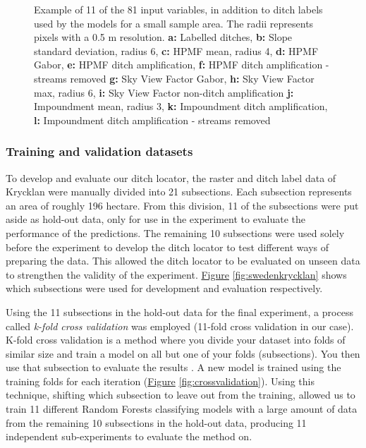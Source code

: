 \documentclass[]{interact}
\theoremstyle{plain}%
\theoremstyle{definition}
\theoremstyle{remark}
\begin{document}
\begin{figure} [!htb]
    \caption{Example of 11 of the 81 input variables, in addition to ditch labels used by the models for a small sample area. The radii represents pixels with a 0.5 m resolution. \newline \textbf{a:} Labelled ditches, \textbf{b:} Slope standard deviation, radius 6, \textbf{c:} HPMF mean, radius 4, \textbf{d:} HPMF Gabor, \textbf{e:} HPMF ditch amplification, \textbf{f:} HPMF ditch amplification - streams removed \textbf{g:} Sky View Factor Gabor, \textbf{h:} Sky View Factor max, radius 6, \textbf{i:} Sky View Factor non-ditch amplification  \textbf{j:} Impoundment mean, radius 3, \textbf{k:} Impoundment ditch amplification, \textbf{l:} Impoundment ditch amplification - streams removed}
    \label{fig:features}
\end{figure}
\clearpage

\subsubsection{Training and validation datasets}
\label{trainingvalidationdatasets}
To develop and evaluate our ditch locator, the raster and ditch label data of Krycklan were manually divided into 21 subsections. Each subsection represents an area of roughly 196 hectare. From this division, 11 of the subsections were put aside as hold-out data, only for use in the experiment to evaluate the performance of the predictions. The remaining 10 subsections were used solely before the experiment to develop the ditch locator to test different ways of preparing the data. This allowed the ditch locator to be evaluated on unseen data to strengthen the validity of the experiment. \hyperref[fig:swedenkrycklan]{Figure} \ref{fig:swedenkrycklan} shows which subsections were used for development and evaluation respectively.

Using the 11 subsections in the hold-out data for the final experiment, a process called \textit{k-fold cross validation} was employed (11-fold cross validation in our case). K-fold cross validation is a method where you divide your dataset into folds of similar size and train a model on all but one of your folds (subsections). You then use that subsection to evaluate the results \citep{crossvalidation}. A new model is trained using the training folds for each iteration (\hyperref[fig:crossvalidation]{Figure} \ref{fig:crossvalidation}). Using this technique, shifting which subsection to leave out from the training, allowed us to train 11 different Random Forests classifying models with a large amount of data from the remaining 10 subsections in the hold-out data, producing 11 independent sub-experiments to evaluate the method on.
\end{document}
